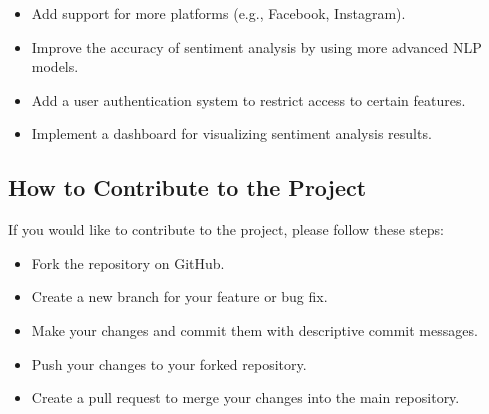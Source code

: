 \documentclass[a4paper]{article}
\begin{document}
\begin{itemize}
    \item Add support for more platforms (e.g., Facebook, Instagram).
    \item Improve the accuracy of sentiment analysis by using more advanced NLP models.
    \item Add a user authentication system to restrict access to certain features.
    \item Implement a dashboard for visualizing sentiment analysis results.
\end{itemize}

\subsection{How to Contribute to the Project}
If you would like to contribute to the project, please follow these steps:

\begin{itemize}
    \item Fork the repository on GitHub.
    \item Create a new branch for your feature or bug fix.
    \item Make your changes and commit them with descriptive commit messages.
    \item Push your changes to your forked repository.
    \item Create a pull request to merge your changes into the main repository.
\end{itemize}
\end{document}
